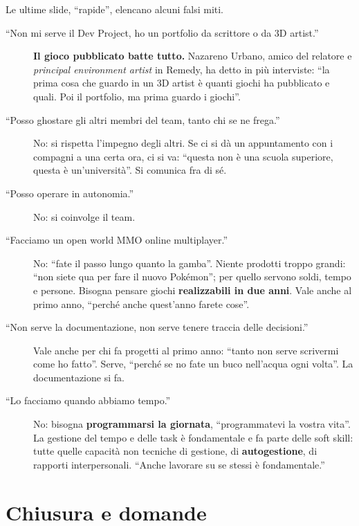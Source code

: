 Le ultime slide, ``rapide'', elencano alcuni falsi miti.
\begin{description}
  \item[``Non mi serve il Dev Project, ho un portfolio da scrittore o da 3D
        artist.''] \textbf{Il gioco pubblicato batte tutto.} Nazareno
        Urbano, amico del relatore e \emph{principal environment artist} in
        Remedy, ha detto in più interviste: ``la prima cosa che guardo in un
        3D artist è quanti giochi ha pubblicato e quali. Poi il portfolio,
        ma prima guardo i giochi''.
  \item[``Posso ghostare gli altri membri del team, tanto chi se ne
        frega.''] No: si rispetta l'impegno degli altri. Se ci si dà un
        appuntamento con i compagni a una certa ora, ci si va: ``questa non
        è una scuola superiore, questa è un'università''. Si comunica fra di
        sé.
  \item[``Posso operare in autonomia.''] No: si coinvolge il team.
  \item[``Facciamo un open world MMO online multiplayer.''] No: ``fate il
        passo lungo quanto la gamba''. Niente prodotti troppo grandi: ``non
        siete qua per fare il nuovo Pokémon''; per quello servono soldi,
        tempo e persone. Bisogna pensare giochi \textbf{realizzabili in due
        anni}. Vale anche al primo anno, ``perché anche quest'anno farete
        cose''.
  \item[``Non serve la documentazione, non serve tenere traccia delle
        decisioni.''] Vale anche per chi fa progetti al primo anno: ``tanto
        non serve scrivermi come ho fatto''. Serve, ``perché se no fate un
        buco nell'acqua ogni volta''. La documentazione si fa.
  \item[``Lo facciamo quando abbiamo tempo.''] No: bisogna
        \textbf{programmarsi la giornata}, ``programmatevi la vostra
        vita''. La gestione del tempo e delle task è fondamentale e fa
        parte delle soft skill: tutte quelle capacità non tecniche di
        gestione, di \textbf{autogestione}, di rapporti interpersonali.
        ``Anche lavorare su se stessi è fondamentale.''
\end{description}

\section{Chiusura e domande}
\label{p1:sec:domande}

